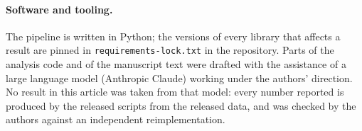 \paragraph{Software and tooling.} The pipeline is written in Python; the versions of every library that affects a result are pinned in \texttt{requirements-lock.txt} in the repository. Parts of the analysis code and of the manuscript text were drafted with the assistance of a large language model (Anthropic Claude) working under the authors' direction. No result in this article was taken from that model: every number reported is produced by the released scripts from the released data, and was checked by the authors against an independent reimplementation.
